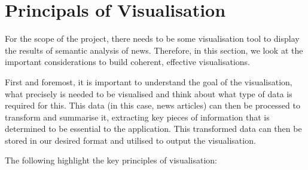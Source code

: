 

\section{Principals of Visualisation} \label{principal_vis}

For the scope of the project, there needs to be some visualisation tool to display the results of semantic analysis of news. Therefore, in this section, we look at the important considerations to build  coherent, effective visualisations. 

First and foremost, it is important to understand the goal of the visualisation, what precisely is needed to be visualised and think about what type of data is required for this. This data (in this case, news articles) can then be processed to transform and summarise it, extracting key pieces of information that is determined to be essential to the application. This transformed data can then be stored in our desired format and utilised to output the visualisation.

The following highlight the key principles of visualisation:


